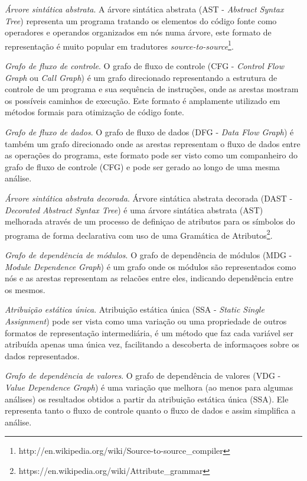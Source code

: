 \begin{description}

  \item \textit{Árvore sintática abstrata}.
    A árvore sintática abstrata (AST - {\it Abstract Syntax Tree}) representa um
    programa tratando os elementos do código fonte como operadores e
    operandos organizados em nós numa árvore, este formato de representação é
    muito popular em tradutores {\it
    source-to-source}\footnote{http://en.wikipedia.org/wiki/Source-to-source\_compiler}.

  \item \textit{Grafo de fluxo de controle}.
    O grafo de fluxo de controle (CFG - {\it Control Flow Graph} ou {\it Call Graph}) é um grafo direcionado
    representando a estrutura de controle de um programa e sua sequência de
    instruções, onde as arestas mostram os possíveis caminhos de execução. Este
    formato é amplamente utilizado em métodos formais para otimização de
    código fonte.

  \item \textit{Grafo de fluxo de dados}.
    O grafo de fluxo de dados (DFG - {\it Data Flow Graph}) é também um grafo
    direcionado onde as arestas representam o fluxo de dados entre as
    operações do programa, este formato pode ser visto como um companheiro do
    grafo de fluxo de controle (CFG) e pode ser gerado ao longo de uma mesma
    análise.

  \item \textit{Árvore sintática abstrata decorada}.
    Árvore sintática abstrata decorada (DAST - {\it Decorated Abstract Syntax Tree}) é
    uma árvore sintática abstrata (AST) melhorada através de um processo de
    definiçao de atributos para os símbolos do programa de forma declarativa
    com uso de uma Gramática de
    Atributos\footnote{https://en.wikipedia.org/wiki/Attribute\_grammar}.

  \item \textit{Grafo de dependência de módulos}.
    O grafo de dependência de módulos (MDG - {\it Module Dependence Graph}) é um grafo
    onde os módulos são representados como nós e as arestas representam as
    relacões entre eles, indicando dependência entre os mesmos.

  \item \textit{Atribuição estática única}.
    Atribuição estática única (SSA - {\it Static Single Assignment}) pode ser vista
    como uma variação ou uma propriedade de outros formatos de representação
    intermediária, é um método que faz cada variável ser atribuída apenas uma única
    vez, facilitando a descoberta de informaçoes sobre os dados representados.

  \item \textit{Grafo de dependência de valores}.
    O grafo de dependência de valores (VDG - {\it Value Dependence Graph}) é uma
    variação que melhora (ao menos para algumas análises) os resultados
    obtidos a partir da atribuição estática única (SSA). Ele representa tanto
    o fluxo de controle quanto o fluxo de dados e assim simplifica a análise.

\end{description}

